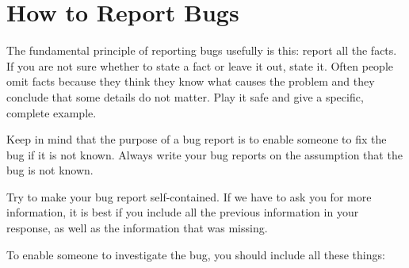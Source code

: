 \section[How to Report Bugs]{\label{sec:how-to-report-bugs}%
  How to Report Bugs}

The fundamental principle of reporting bugs usefully is this: report all the facts.  If you are
not sure whether to state a fact or leave it out, state it.  Often people omit facts because
they think they know what causes the problem and they conclude that some details do not matter.
Play it safe and give a specific, complete example.

Keep in mind that the purpose of a bug report is to enable someone to fix the bug if it is not
known.  Always write your bug reports on the assumption that the bug is not known.

Try to make your bug report self-contained.  If we have to ask you for more information, it is
best if you include all the previous information in your response, as well as the information
that was missing.

To enable someone to investigate the bug, you should include all these things:

